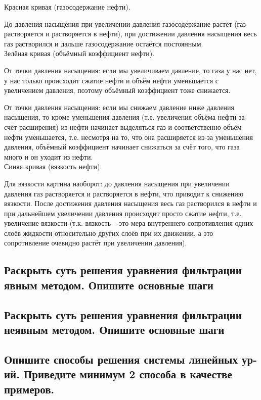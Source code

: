 \documentclass[main.tex]{subfiles}
\begin{document}
Красная кривая (газосодержание нефти).

До давления насыщения при увеличении давления газосодержание растёт (газ растворяется и растворяется в нефти), при достижении давления насыщения весь газ растворился и дальше газосодержание остаётся постоянным.
\\

Зелёная кривая (объёмный коэффициент нефти).

От точки давления насыщения: если мы увеличиваем давление, то газа у нас нет, у нас только происходит сжатие нефти и объём нефти уменьшается с увеличением давления, поэтому объёмный коэффициент тоже снижается.

От точки давления насыщения: если мы снижаем давление ниже давления насыщения, то кроме уменьшения давления (т.е. увеличения объёма нефти за счёт расширения) из нефти начинает выделяться газ и соответственно объём нефти уменьшается, т.е. несмотря на то, что она расширяется из-за уменьшения давления, объёмный коэффициент начинает снижаться за счёт того, что газа много и он уходит из нефти.
\\

Синяя кривая (вязкость нефти).

Для вязкости картина наоборот: до давления насыщения при увеличении давления газ растворяется и растворяется в нефти, что приводит к снижению вязкости.
После достижения давления насыщения весь газ растворился в нефти и при дальнейшем увеличении давления происходит просто сжатие нефти, т.е. увеличение вязкости (т.к. вязкость -- это мера внутреннего сопротивления одних слоёв жидкости относительно других слоёв при их движении, а это сопротивление очевидно растёт при увеличении давления).

\newpage

\subsection{Раскрыть суть решения уравнения фильтрации явным методом. Опишите основные шаги}

\newpage

\subsection{Раскрыть суть решения уравнения фильтрации неявным методом. Опишите основные шаги}

\newpage

\subsection{Опишите способы решения системы линейных ур-ий. Приведите минимум 2 способа в качестве примеров.}
\end{document}
